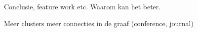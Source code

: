 Conclusie, feature work etc. Waarom kan het beter.


Meer clusters 
meer connecties in de graaf (conference, journal)

